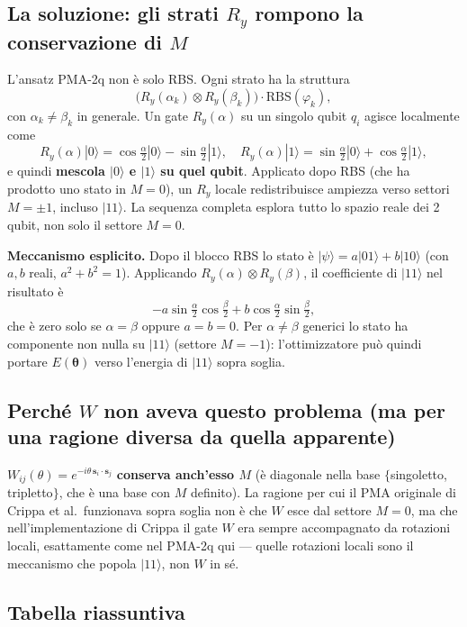\documentclass[11pt,a4paper]{article}
\begin{document}
\subsection*{La soluzione: gli strati $R_y$ rompono la conservazione di $M$}

L'ansatz PMA-2q non è solo RBS. Ogni strato ha la struttura
$$\bigl(R_y(\alpha_k)\otimes R_y(\beta_k)\bigr)\cdot\mathrm{RBS}(\varphi_k),$$
con $\alpha_k\neq\beta_k$ in generale. Un gate $R_y(\alpha)$ su un
singolo qubit $q_i$ agisce localmente come
$$R_y(\alpha)|0\rangle=\cos\tfrac\alpha2|0\rangle-\sin\tfrac\alpha2|1\rangle,\quad
R_y(\alpha)|1\rangle=\sin\tfrac\alpha2|0\rangle+\cos\tfrac\alpha2|1\rangle,$$
e quindi \textbf{mescola $|0\rangle$ e $|1\rangle$ su quel qubit}.
Applicato dopo RBS (che ha prodotto uno stato in $M=0$), un $R_y$
locale redistribuisce ampiezza verso settori $M=\pm1$, incluso
$|11\rangle$. La sequenza completa esplora tutto lo spazio reale dei 2
qubit, non solo il settore $M=0$.

\textbf{Meccanismo esplicito.} Dopo il blocco RBS lo stato è
$|\psi\rangle=a|01\rangle+b|10\rangle$ (con $a,b$ reali,
$a^2+b^2=1$). Applicando $R_y(\alpha)\otimes R_y(\beta)$, il
coefficiente di $|11\rangle$ nel risultato è
$$-a\sin\tfrac\alpha2\cos\tfrac\beta2+b\cos\tfrac\alpha2\sin\tfrac\beta2,$$
che è zero solo se $\alpha=\beta$ oppure $a=b=0$. Per $\alpha\neq\beta$
generici lo stato ha componente non nulla su $|11\rangle$ (settore
$M=-1$): l'ottimizzatore può quindi portare $E(\boldsymbol\theta)$
verso l'energia di $|11\rangle$ sopra soglia.

\subsection*{Perché $W$ non aveva questo problema (ma per una ragione diversa da quella apparente)}

$W_{ij}(\theta)=e^{-i\theta\,\mathbf s_i\cdot\mathbf s_j}$
\textbf{conserva anch'esso $M$} (è diagonale nella base
$\{$singoletto, tripletto$\}$, che è una base con $M$ definito). La
ragione per cui il PMA originale di Crippa et al.\ funzionava sopra
soglia non è che $W$ esce dal settore $M=0$, ma che
nell'implementazione di Crippa il gate $W$ era sempre accompagnato da
rotazioni locali, esattamente come nel PMA-2q qui --- quelle rotazioni
locali sono il meccanismo che popola $|11\rangle$, non $W$ in sé.

\subsection*{Tabella riassuntiva}
\end{document}
